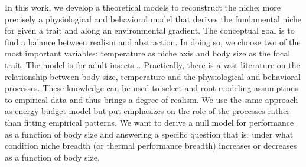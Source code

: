 In this work, we develop a theoretical models to reconstruct the niche; more precisely a physiological and behavioral model that derives the fundamental niche for given a trait and along an environmental gradient.
The conceptual goal is to find a balance between realism and abstraction.
In doing so, we choose two of the most important variables: temperature as niche axis and body size as the focal trait.
The model is for adult insects...%
Practically, there is a vast literature on the relationship between body size, temperature and the physiological and behavioral processes.
These knowledge can be used to select and root modeling assumptions to empirical data and thus brings a degree of realism.
We use the same approach as energy budget model but put emphasizes on the role of the processes rather than fitting empirical patterns.
We want to derive a null model for performance as a function of body size and answering a specific question that is: under what condition niche breadth (or thermal performance breadth) increases or decreases as a function of body size.

